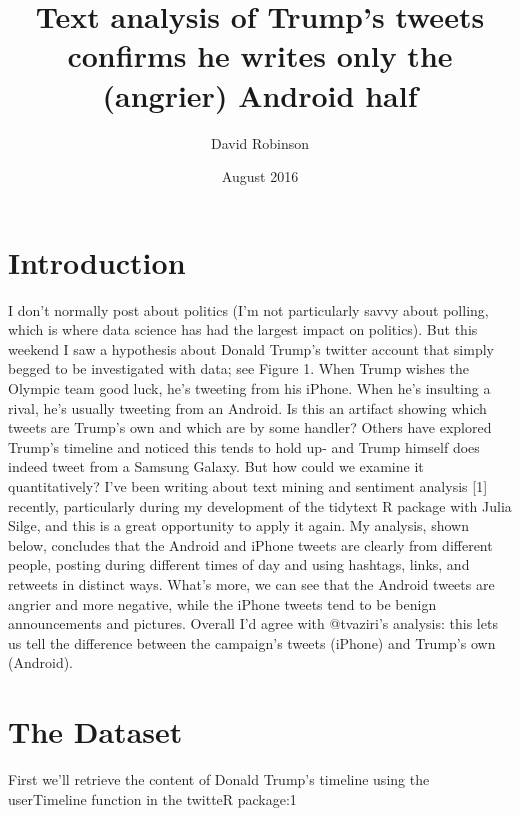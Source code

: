 \documentclass[a4paper,12pt]{article}
\title{Text analysis of Trump’s tweets confirms he writes only the
(angrier) Android half}
\author{David Robinson}
\date{August 2016}
\begin{document}
\maketitle

\section{Introduction}
I don’t normally post about politics (I’m not particularly savvy about polling, which is where
data science has had the largest impact on politics). But this weekend I saw a hypothesis about
Donald Trump’s twitter account that simply begged to be investigated with data; see Figure 1.
When Trump wishes the Olympic team good luck, he’s tweeting from his iPhone. When he’s
insulting a rival, he’s usually tweeting from an Android. Is this an artifact showing which tweets
are Trump’s own and which are by some handler?
Others have explored Trump’s timeline and noticed this tends to hold up- and Trump himself
does indeed tweet from a Samsung Galaxy. But how could we examine it quantitatively? I’ve been
writing about text mining and sentiment analysis [1] recently, particularly during my development
of the tidytext R package with Julia Silge, and this is a great opportunity to apply it again.
My analysis, shown below, concludes that the Android and iPhone tweets are clearly from
different people, posting during different times of day and using hashtags, links, and retweets
in distinct ways. What’s more, we can see that the Android tweets are angrier and more
negative, while the iPhone tweets tend to be benign announcements and pictures. Overall I’d agree
with @tvaziri’s analysis: this lets us tell the difference between the campaign’s tweets (iPhone) and
Trump’s own (Android).

\section{The Dataset}
First we’ll retrieve the content of Donald Trump’s timeline using the userTimeline function in the
twitteR package:1

\printbibliography
\end{document}
